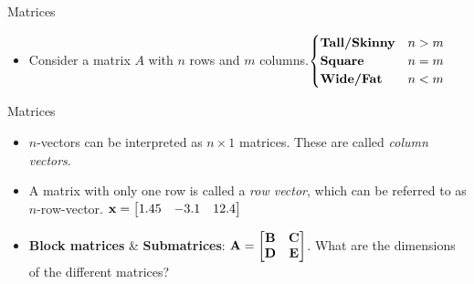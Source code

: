\documentclass[aspectratio=169]{beamer}
\begin{document}
\begin{frame}[t]{Matrices}
\begin{itemize}
\begin{center}
\hspace{0.5cm}
    \end{center}
    \item Consider a matrix $A$ with $n$ rows and $m$ columns.$ \begin{cases} \text{\textbf{Tall/Skinny}} & n > m\\
      \text{\textbf{Square}} & n = m\\
      \text{\textbf{Wide/Fat}} & n < m\\
    \end{cases}$
  \end{itemize}
\end{frame}

\begin{frame}[t]{Matrices}
  \begin{itemize}
    \item $n$-vectors can be interpreted as $n \times 1$ matrices. These are called \textit{column vectors}.
    \item A matrix with only one row is called a \textit{row vector}, which can be referred to as $n$-row-vector.  $\mathbf{x} = \begin{bmatrix}1.45 & -3.1 & 12.4\end{bmatrix}$
    \item\textbf{Block matrices} \& \textbf{Submatrices}: $\mathbf{A} = \begin{bmatrix}
      \mathbf{B} & \mathbf{C} \\
      \mathbf{D} & \mathbf{E}
    \end{bmatrix}$.  What are the dimensions of the different matrices?
  \end{itemize}
\end{frame}
\end{document}
